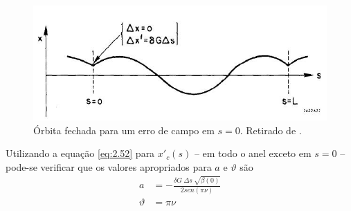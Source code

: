 \begin{figure}[!htb]
	\centering
	\includegraphics[width=0.7\linewidth]{./Figuras/fig22.jpeg}
	\caption{Órbita fechada para um erro de campo em $s=0$. Retirado de \cite{sands1970physics}.}
	\label{fig:fig22}
\end{figure}

Utilizando a equação \eqref{eq:2.52} para $x'_c(s)$ -- em todo o anel exceto em $s=0$ -- pode-se verificar que os valores apropriados para $a$ e $\vartheta$ são
\begin{align}
	a &= -\frac{\delta G\ \Delta s\ \sqrt{\beta(0)}}{2 sen(\pi \nu)}\\
	\vartheta &= \pi \nu
\end{align}

